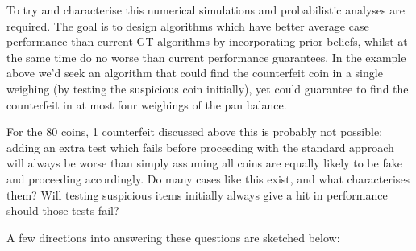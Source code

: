 To try and characterise this numerical simulations and probabilistic analyses are required. The goal is to design algorithms which have better average case performance than current GT algorithms by incorporating prior beliefs, whilst at the same time do no worse than current performance guarantees. In the example above we'd seek an algorithm that could find the counterfeit coin in a single weighing (by testing the suspicious coin initially), yet could guarantee to find the counterfeit in at most four weighings of the pan balance. 

For the 80 coins, 1 counterfeit discussed above this is probably not possible: adding an extra test which fails before proceeding with the standard approach will always be worse than simply assuming all coins are equally likely to be fake and proceeding accordingly. Do many cases like this exist, and what characterises them? Will testing suspicious items initially always give a hit in performance should those tests fail? 

A few directions into answering these questions are sketched below:

